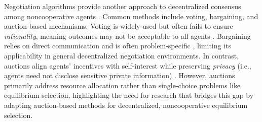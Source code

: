 Negotiation algorithms provide another approach to decentralized consensus among noncooperative agents \cite{nego_shoham}. Common methods include voting, bargaining, and auction-based mechanisms. Voting is widely used but often fails to ensure \textit{rationality}, meaning outcomes may not be acceptable to all agents \cite{nego_shoham}. Bargaining relies on direct communication and is often problem-specific \cite{nego_meyerson_bargain_auction, nego_noncoopBargain, nego_tournament}, limiting its applicability in general decentralized negotiation environments. In contrast, auctions align agents' incentives with self-interest while preserving \textit{privacy} (i.e., agents need not disclose sensitive private information) \cite{nego_bertsekas, nego_meyerson_bargain_auction, nego_rational_auction, nego_shoham, nego_bertsekas_2009}. However, auctions primarily address resource allocation rather than single-choice problems like equilibrium selection, highlighting the need for research that bridges this gap by adapting auction-based methods for decentralized, noncooperative equilibrium selection. 
